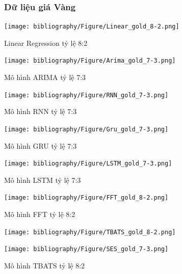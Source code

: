 \documentclass[conference]{IEEEtran}
\begin{document}
\begin{figure}[t] 
\subsubsection{Dữ liệu giá Vàng}
    \raggedright
    \begin{minipage}{0.5\textwidth}
        \centering
        \begin{minipage}{0.45\textwidth}
            \centering
            \texttt{[image: bibliography/Figure/Linear\_gold\_8-2.png]}
            \caption{Linear Regression tỷ lệ 8:2}
        \end{minipage}
        \hfill
        \begin{minipage}{0.45\textwidth}
            \centering
            \texttt{[image: bibliography/Figure/Arima\_gold\_7-3.png]}
            \caption{Mô hình ARIMA tỷ lệ 7:3}
        \end{minipage}
        \hfill
        \begin{minipage}{0.45\textwidth}
            \centering
            \texttt{[image: bibliography/Figure/RNN\_gold\_7-3.png]}
            \caption{Mô hình RNN tỷ lệ 7:3}
        \end{minipage}
        \hfill
        \begin{minipage}{0.45\textwidth}
            \centering
            \texttt{[image: bibliography/Figure/Gru\_gold\_7-3.png]} 
            \caption{Mô hình GRU tỷ lệ 7:3}
        \end{minipage}
        \hfill
        \begin{minipage}{0.45\textwidth}
            \centering
            \texttt{[image: bibliography/Figure/LSTM\_gold\_7-3.png]} 
            \caption{Mô hình LSTM tỷ lệ 7:3}
        \end{minipage}
        \hfill
        \begin{minipage}{0.45\textwidth}
            \centering
            \texttt{[image: bibliography/Figure/FFT\_gold\_8-2.png]} 
            \caption{Mô hình FFT tỷ lệ 8:2}
        \end{minipage}
         \hfill
        \begin{minipage}{0.45\textwidth}
            \centering
            \texttt{[image: bibliography/Figure/TBATS\_gold\_8-2.png]} 
            \caption{Mô hình TBATS tỷ lệ 8:2}
        \end{minipage}
        \hfill
        \begin{minipage}{0.45\textwidth}
            \centering
            \texttt{[image: bibliography/Figure/SES\_gold\_7-3.png]} 

\end{minipage}
\end{minipage}
\end{figure}
\end{document}
